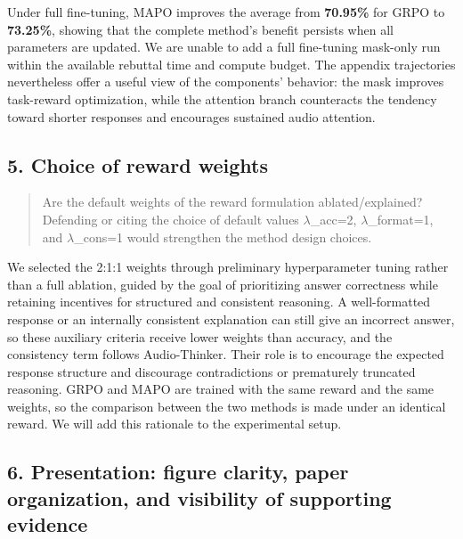 Under full fine-tuning, MAPO improves the average from \textbf{70.95\%} for GRPO to \textbf{73.25\%}, showing that the complete method's benefit persists when all parameters are updated. We are unable to add a full fine-tuning mask-only run within the available rebuttal time and compute budget. The appendix trajectories nevertheless offer a useful view of the components' behavior: the mask improves task-reward optimization, while the attention branch counteracts the tendency toward shorter responses and encourages sustained audio attention.

\subsection*{5. Choice of reward weights}

\begin{quote}\small\color{ReviewQuote}
Are the default weights of the reward formulation ablated/explained? Defending or citing the choice of default values \ensuremath{\lambda}\_acc=2, \ensuremath{\lambda}\_format=1, and \ensuremath{\lambda}\_cons=1 would strengthen the method design choices.

\end{quote}

We selected the 2:1:1 weights through preliminary hyperparameter tuning rather than a full ablation, guided by the goal of prioritizing answer correctness while retaining incentives for structured and consistent reasoning. A well-formatted response or an internally consistent explanation can still give an incorrect answer, so these auxiliary criteria receive lower weights than accuracy, and the consistency term follows Audio-Thinker. Their role is to encourage the expected response structure and discourage contradictions or prematurely truncated reasoning. GRPO and MAPO are trained with the same reward and the same weights, so the comparison between the two methods is made under an identical reward. We will add this rationale to the experimental setup.

\subsection*{6. Presentation: figure clarity, paper organization, and visibility of supporting evidence}

